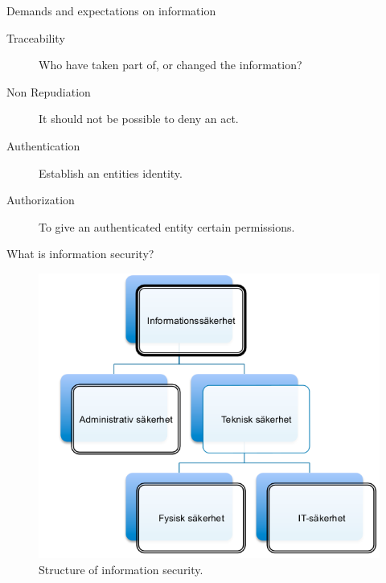 \documentclass{beamer}
\begin{document}
\begin{frame}{Demands and expectations on information}
  \begin{description}
    \item[Traceability] Who have taken part of, or changed the information?
    \item[Non Repudiation] It should not be possible to deny an act.
    \item[Authentication] Establish an entities identity.
    \item[Authorization] To give an authenticated entity certain permissions.
  \end{description}
\end{frame}

\begin{frame}{What is information security?}
  \begin{figure}
    \includegraphics[height=0.7\textheight]{Figures/infosak-struktur.png}
    \caption{Structure of information security.}
  \end{figure}
\end{frame}
\end{document}
